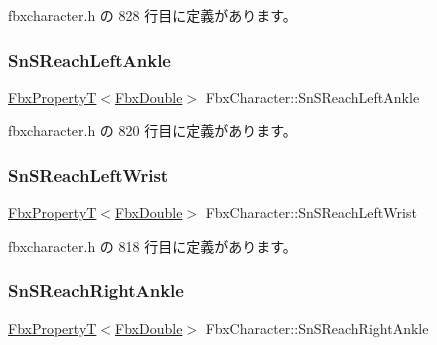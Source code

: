  fbxcharacter.\+h の 828 行目に定義があります。

\mbox{\label{class_fbx_character_af9b0d39293aad84029f2da0b26e88a97}} 
\subsubsection{\texorpdfstring{Sn\+S\+Reach\+Left\+Ankle}{SnSReachLeftAnkle}}
{\footnotesize\ttfamily \hyperlink{class_fbx_property_t}{Fbx\+PropertyT}$<$\hyperlink{fbxtypes_8h_a171e72a1c46fc15c1a6c9c31948c1c5b}{Fbx\+Double}$>$ Fbx\+Character\+::\+Sn\+S\+Reach\+Left\+Ankle}



 fbxcharacter.\+h の 820 行目に定義があります。

\mbox{\label{class_fbx_character_ac7602d7ef2b2cb28477bbe0a52dd8f8a}} 
\subsubsection{\texorpdfstring{Sn\+S\+Reach\+Left\+Wrist}{SnSReachLeftWrist}}
{\footnotesize\ttfamily \hyperlink{class_fbx_property_t}{Fbx\+PropertyT}$<$\hyperlink{fbxtypes_8h_a171e72a1c46fc15c1a6c9c31948c1c5b}{Fbx\+Double}$>$ Fbx\+Character\+::\+Sn\+S\+Reach\+Left\+Wrist}



 fbxcharacter.\+h の 818 行目に定義があります。

\mbox{\label{class_fbx_character_a7c55eeeda37b29ec7c71c5f7ca1b9e22}} 
\subsubsection{\texorpdfstring{Sn\+S\+Reach\+Right\+Ankle}{SnSReachRightAnkle}}
{\footnotesize\ttfamily \hyperlink{class_fbx_property_t}{Fbx\+PropertyT}$<$\hyperlink{fbxtypes_8h_a171e72a1c46fc15c1a6c9c31948c1c5b}{Fbx\+Double}$>$ Fbx\+Character\+::\+Sn\+S\+Reach\+Right\+Ankle}



